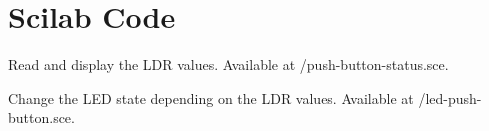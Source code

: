 \section{Scilab Code}
\label{sec:push-scilab-code}
\begin{scicode}
{Read and display the LDR values.  Available at
  \LocPushscibrief/push-button-status.sce.} 
\label{sci:push-100}

\end{scicode}

\begin{scicode}
{Change the LED state depending on the LDR values. Available at
  \LocPushscibrief/led-push-button.sce.} 
\label{sci:push-200}

\end{scicode}
